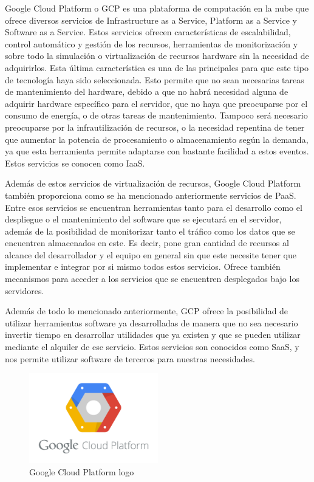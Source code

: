 Google Cloud Platform o \acs{GCP} es una plataforma de computación en la nube \cite{CloudComputing} que ofrece diversos servicios de Infrastructure as a Service, Platform as a Service y Software as a Service. Estos servicios ofrecen características de escalabilidad, control automático y gestión de los recursos, herramientas de monitorización y sobre todo la simulación o virtualización de recursos hardware sin la necesidad de adquirirlos. Esta última característica es una de las principales para que este tipo de tecnología haya sido seleccionada. Esto permite que no sean necesarias tareas de mantenimiento del hardware, debido a que no habrá necesidad alguna de adquirir hardware específico para el servidor, que no haya que preocuparse por el consumo de energía, o de otras tareas de mantenimiento. Tampoco será necesario preocuparse por la infrautilización de recursos, o la necesidad repentina de tener que aumentar la potencia de procesamiento o almacenamiento según la demanda, ya que esta herramienta permite adaptarse con bastante facilidad a estos eventos. Estos servicios se conocen como \acs{IaaS}.

Además de estos servicios de virtualización de recursos, Google Cloud Platform también proporciona como se ha mencionado anteriormente servicios de \acs{PaaS}. Entre esos servicios se encuentran herramientas tanto para el desarrollo como el despliegue o el mantenimiento del software que se ejecutará en el servidor, además de la posibilidad de monitorizar tanto el tráfico como los datos que se encuentren almacenados en este. Es decir, pone gran cantidad de recursos al alcance del desarrollador y el equipo en general sin que este necesite tener que implementar e integrar por si mismo todos estos servicios. Ofrece también mecanismos para acceder a los servicios que se encuentren desplegados bajo los servidores.

Además de todo lo mencionado anteriormente, \acs{GCP} ofrece la posibilidad de utilizar herramientas software ya desarrolladas de manera que no sea necesario invertir tiempo en desarrollar utilidades que ya existen y que se pueden utilizar mediante el alquiler de ese servicio. Estos servicios son conocidos como \acs{SaaS}, y nos permite utilizar software de terceros para nuestras necesidades.


\begin{figure}[!h]
\begin{center}
\includegraphics[width=0.5\textwidth]{./figures/GCP.png}
\caption{Google Cloud Platform logo}
\label{fig:android-studio}
\end{center}
\end{figure}

